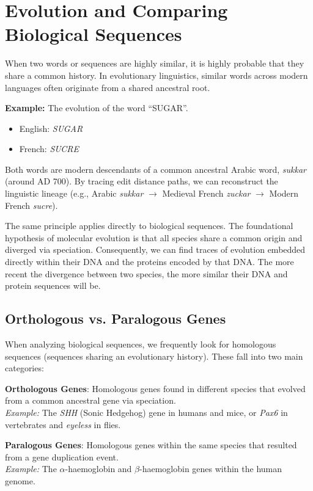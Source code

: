 \documentclass[11pt, a4paper]{article}
\newenvironment{important}
  {\begin{tcolorbox}[colback=blue!5!white, colframe=blue!75!black, arc=1mm, boxrule=1pt]}
  {\end{tcolorbox}}
\begin{document}

\section{Evolution and Comparing Biological Sequences}

When two words or sequences are highly similar, it is highly probable that they share a common history. In evolutionary linguistics, similar words across modern languages often originate from a shared ancestral root. 

\textbf{Example:} The evolution of the word ``SUGAR''.
\begin{itemize}
    \item English: \textit{SUGAR}
    \item French: \textit{SUCRE}
\end{itemize}
Both words are modern descendants of a common ancestral Arabic word, \textit{sukkar} (around AD 700). By tracing edit distance paths, we can reconstruct the linguistic lineage (e.g., Arabic \textit{sukkar} $\rightarrow$ Medieval French \textit{zuckar} $\rightarrow$ Modern French \textit{sucre}).

The same principle applies directly to biological sequences. The foundational hypothesis of molecular evolution is that all species share a common origin and diverged via speciation. Consequently, we can find traces of evolution embedded directly within their DNA and the proteins encoded by that DNA. The more recent the divergence between two species, the more similar their DNA and protein sequences will be.


\subsection{Orthologous vs. Paralogous Genes}
When analyzing biological sequences, we frequently look for homologous sequences (sequences sharing an evolutionary history). These fall into two main categories:

\begin{important}
  \textbf{Orthologous Genes}: Homologous genes found in different species that evolved from a common ancestral gene via speciation.
  \\ \textit{Example:} The \textit{SHH} (Sonic Hedgehog) gene in humans and mice, or \textit{Pax6} in vertebrates and \textit{eyeless} in flies.
  
  \vspace{0.5em}
  \textbf{Paralogous Genes}: Homologous genes within the same species that resulted from a gene duplication event. 
  \\ \textit{Example:} The $\alpha$-haemoglobin and $\beta$-haemoglobin genes within the human genome.
\end{important}
\end{document}
